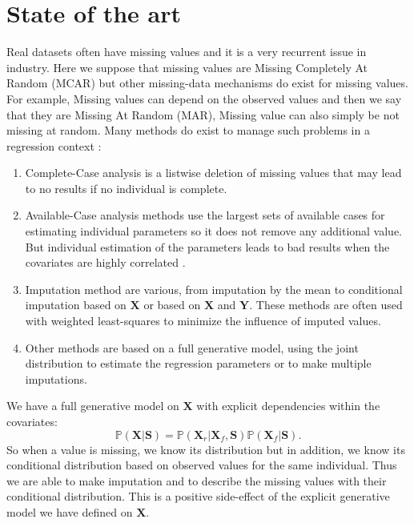 \documentclass[12pt,a4paper]{report}
\begin{document}
		 \section{State of the art}
	Real datasets often have missing values and it is a very recurrent issue in industry. 
			Here we suppose that missing values are Missing Completely At Random (MCAR) but other missing-data mechanisms do exist for missing values. For example, Missing values can depend on the observed values and then we say that they are Missing At Random (MAR), Missing value can also simply be not missing at random.
	 Many methods do exist to manage such problems in a regression context \cite{little1992regression}:
	 \begin{enumerate}
	\item Complete-Case analysis is a listwise deletion of missing values that may lead to no results if no individual is complete.  	
	\item Available-Case analysis methods use the largest sets of available cases for estimating individual parameters so it does not remove any additional value. But individual estimation of the parameters leads to bad results when the covariates are highly correlated \cite{haitovsky1968missing}.
	\item Imputation method are various, from imputation by the mean to conditional imputation based on $\boldsymbol{X}$ or based on $\boldsymbol{X}$ and $\boldsymbol{Y}$. These methods are often used with weighted least-squares to minimize the influence of imputed values.
	\item Other methods are based on a full generative model, using the joint distribution to estimate the regression parameters or to make multiple imputations.
	\end{enumerate} 
%	 
%	 
	We have a full generative model on $\boldsymbol{X}$ with explicit dependencies within the covariates:
	\begin{equation*}
	\mathbb{P}(\boldsymbol{X}|\boldsymbol{S})=\mathbb{P}(\boldsymbol{X}_r|\boldsymbol{X}_f,\boldsymbol{S})\mathbb{P}(\boldsymbol{X}_f|\boldsymbol{S}).
\end{equation*}	 
So when a value is missing, we know its distribution but in addition, we know its conditional distribution based on observed values for the same individual. Thus we are able to make imputation and to describe the missing values with their conditional distribution. This is a positive side-effect of the explicit generative model we have defined on $\boldsymbol{X}$.\\
		
\end{document}
